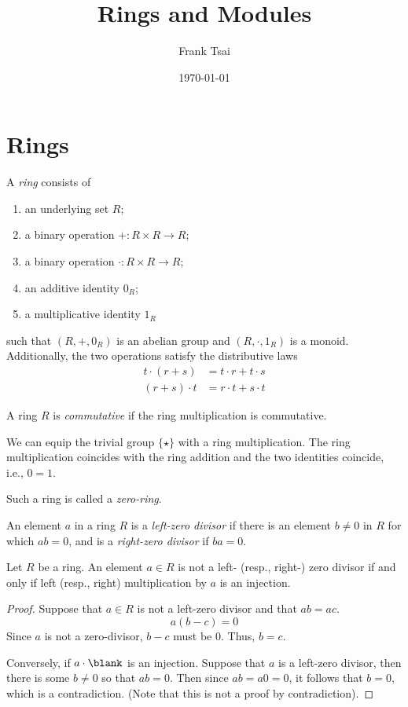 \documentclass{amsart}
\title{Rings and Modules}
\author{Frank Tsai}
\date{\today}
\begin{document}
\maketitle
\tableofcontents

\section{Rings}
\label{sec:rings}

\begin{defn}
  A \emph{ring} consists of
  \begin{enumerate}
  \item an underlying set $R$;
  \item a binary operation $+ : R \times R \to R$;
  \item a binary operation $\cdot : R \times R \to R$;
  \item an additive identity $0_{R}$;
  \item a multiplicative identity $1_{R}$
  \end{enumerate}
  such that $(R,+,0_{R})$ is an abelian group and $(R,\cdot,1_{R})$ is a monoid.
  Additionally, the two operations satisfy the distributive laws
  \begin{align}
    t \cdot (r + s) &= t \cdot r + t \cdot s\\
    (r + s) \cdot t &= r \cdot t + s \cdot t
  \end{align}
\end{defn}

\begin{defn}
  A ring $R$ is \emph{commutative} if the ring multiplication is commutative.
\end{defn}

We can equip the trivial group $\{\star\}$ with a ring multiplication.
The ring multiplication coincides with the ring addition and the two identities coincide, i.e., $0 = 1$.
\begin{defn}
  Such a ring is called a \emph{zero-ring}.
\end{defn}

\begin{defn}
  An element $a$ in a ring $R$ is a \emph{left-zero divisor} if there is an element $b \ne 0$ in $R$ for which $ab = 0$, and is a \emph{right-zero divisor} if $ba = 0$.
\end{defn}

\begin{lem}
  Let $R$ be a ring.
  An element $a \in R$ is not a left- (resp., right-) zero divisor if and only if left (resp., right) multiplication by $a$ is an injection.
\end{lem}
\begin{proof}
  Suppose that $a \in R$ is not a left-zero divisor and that $ab = ac$.
  \[
    a(b - c) = 0
  \]
  Since $a$ is not a zero-divisor, $b - c$ must be $0$.
  Thus, $b = c$.

  Conversely, if $a \cdot \blank$ is an injection.
  Suppose that $a$ is a left-zero divisor, then there is some $b \ne 0$ so that $ab = 0$.
  Then since $ab = a0 = 0$, it follows that $b = 0$, which is a contradiction.
  (Note that this is not a proof by contradiction).
\end{proof}
\end{document}
